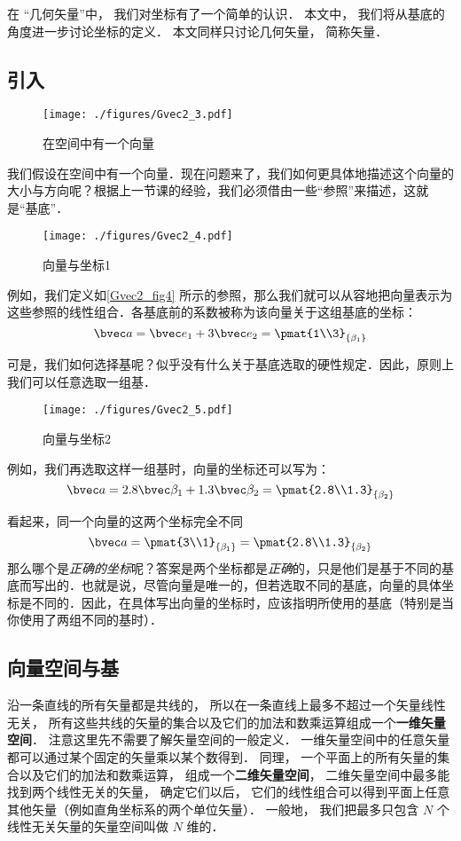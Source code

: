 

在 “几何矢量”中， 我们对坐标有了一个简单的认识． 本文中， 我们将从基底的角度进一步讨论坐标的定义． 本文同样只讨论几何矢量， 简称矢量．

\subsection{引入}
\begin{figure}[ht]
\centering
\texttt{[image: ./figures/Gvec2\_3.pdf]}
\caption{在空间中有一个向量} \label{Gvec2_fig3}
\end{figure}

我们假设在空间中有一个向量．现在问题来了，我们如何更具体地描述这个向量的大小与方向呢？根据上一节课的经验，我们必须借由一些“参照”来描述，这就是“基底”．

\begin{figure}[ht]
\centering
\texttt{[image: ./figures/Gvec2\_4.pdf]}
\caption{向量与坐标1} \label{Gvec2_fig4}
\end{figure}
例如，我们定义如\autoref{Gvec2_fig4} 所示的参照，那么我们就可以从容地把向量表示为这些参照的线性组合．各基底前的系数被称为该向量关于这组基底的坐标：
$$\bvec a = \bvec e_1 + 3\bvec e_2=
\pmat{1\\3}_{\{\beta_1\}}$$

可是，我们如何选择基呢？似乎没有什么关于基底选取的硬性规定．因此，原则上我们可以任意选取一组基．
\begin{figure}[ht]
\centering
\texttt{[image: ./figures/Gvec2\_5.pdf]}
\caption{向量与坐标2} \label{Gvec2_fig5}
\end{figure}
例如，我们再选取这样一组基时，向量的坐标还可以写为：
$$\bvec a = 2.8 \bvec \beta_1 + 1.3 \bvec \beta_2=
\pmat{2.8\\1.3}_{\{\beta_2\}}$$

看起来，同一个向量的这两个坐标完全不同
$$\bvec a = \pmat{3\\1}_{\{\beta_1\}} =
\pmat{2.8\\1.3}_{\{\beta_2\}}$$
那么哪个是\textsl{正确的坐标}呢？答案是两个坐标都是\textsl{正确}的，只是他们是基于不同的基底而写出的．也就是说，尽管向量是唯一的，但若选取不同的基底，向量的具体坐标是不同的．因此，在具体写出向量的坐标时，应该指明所使用的基底（特别是当你使用了两组不同的基时）．

\subsection{向量空间与基}
沿一条直线的所有矢量都是共线的， 所以在一条直线上最多不超过一个矢量线性无关， 所有这些共线的矢量的集合以及它们的加法和数乘运算组成一个\textbf{一维矢量空间}． 注意这里先不需要了解矢量空间的一般定义． 一维矢量空间中的任意矢量都可以通过某个固定的矢量乘以某个数得到． 同理， 一个平面上的所有矢量的集合以及它们的加法和数乘运算， 组成一个\textbf{二维矢量空间}， 二维矢量空间中最多能找到两个线性无关的矢量， 确定它们以后， 它们的线性组合可以得到平面上任意其他矢量（例如直角坐标系的两个单位矢量）． 一般地， 我们把最多只包含 $N$ 个线性无关矢量的矢量空间叫做 $N$ 维的．

